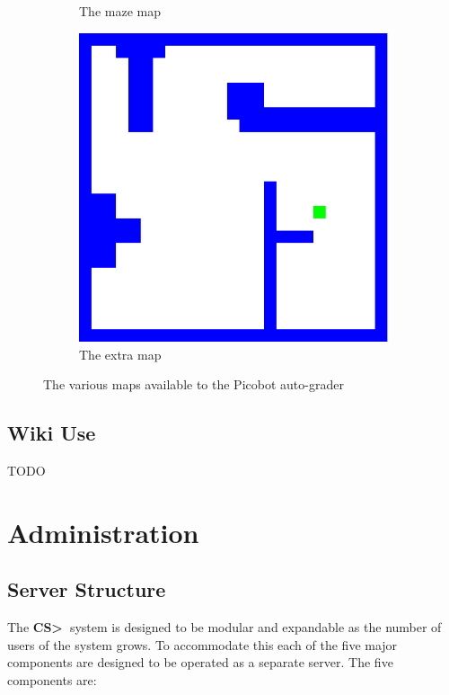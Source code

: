 \documentclass[11pt]{report}
\newcommand{\csgt}[0]{\textbf{CS\textgreater\ }}
\begin{document}
\begin{figure}
\begin{subfigure}[b]{0.3\textwidth}
		\caption{The maze map}
		\label{fig:maze_map}
	\end{subfigure}
	\begin{subfigure}[b]{0.3\textwidth}
		\includegraphics[width=\textwidth]{diagrams/extraMap}
		\caption{The extra map}
		\label{fig:extra_map}
	\end{subfigure}
	\caption{The various maps available to the Picobot auto-grader}
	\label{fig:maps}
\end{figure}

\pagebreak
\section{Wiki Use}
\label{sec:wiki}
TODO

\chapter{Administration}
\label{ch:admin}
\section{Server Structure}
The \csgt system is designed to be modular and expandable as the number of users of the system grows.
To accommodate this each of the five major components are designed to be operated as a separate server.
The five components are:
\end{document}
